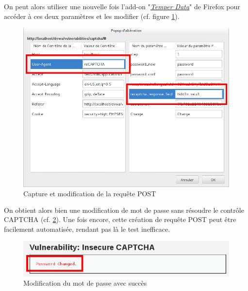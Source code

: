 On peut alors utiliser une nouvelle fois l'add-on "\href{https://addons.mozilla.org/fr/firefox/addon/tamper-data/}{\textit{Temper Data}}" de Firefox pour accéder à ces deux paramètres et les modifier (cf. figure \ref{captcha5}).

\begin{figure}[!h]
\begin{center}

\includegraphics[scale=0.5]{images/captcha5.png}

\caption{Capture et modification de la requête POST}
\label{captcha5}
\end{center}
\end{figure}

On obtient alors bien une modification de mot de passe sans résoudre le contrôle CAPTCHA (cf. \ref{captcha6}). Une fois encore, cette création de requête POST peut être facilement automatisée, rendant pas là le test inefficace.\\

\begin{figure}[!h]
\begin{center}

\includegraphics[scale=0.5]{images/captcha6.png}

\caption{Modification du mot de passe avec succès}
\label{captcha6}
\end{center}
\end{figure}

